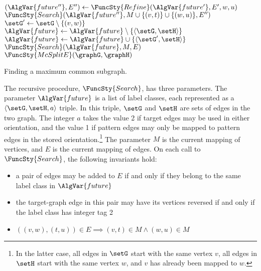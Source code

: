 \begin{algorithm}[htb]
{{{\nl        $(\AlgVar{future''}, E'') \gets \FuncSty{Refine}(\AlgVar{future'}, E', w, u)$ \;
\nl        $\FuncSty{Search}(\AlgVar{future''}, M\cup \{(v,t)\} \cup \{(w,u)\}, E'')$ \label{ExpandWithtu} \;
       } 
  }
\nl $\setG' \gets \setG \setminus \{(v,w)\}$ \label{RemoveVW} \;
\nl $\AlgVar{future} \gets \AlgVar{future} \setminus \{\langle \setG,\setH \rangle\}$\;
\nl {} {$\AlgVar{future} \gets \AlgVar{future} \cup \{\langle \setG',\setH \rangle \}$}
\nl $\FuncSty{Search}(\AlgVar{future},M,E)$ \label{ExpandWithoutVW} \;
}
\;
\nl $\FuncSty{McSplitE}(\graphG,\graphH)$ \label{McSplitFun} \;
\nl {}
\caption{Finding a maximum common subgraph.}
\label{McSplitAlg}
\end{algorithm}

The recursive procedure,
$\FuncSty{Search}$, has three parameters.  The parameter $\AlgVar{future}$ is a
list of label classes, each represented as a $\langle \setG, \setH, a\rangle$
triple.  In this triple, $\setG$ and $\setH$ are sets of edges in the two
graph.  The integer $a$ takes the value 2 if target edges may be used in either
orientation, and the value 1 if pattern edges may only be mapped to pattern
edges in the stored orientation.\footnote{In the latter case, all edges in
$\setG$ start with the same vertex $v$, all edges in $\setH$ start with the
same vertex $w$, and $v$ has already been mapped to $w$.}  The parameter $M$ is
the current mapping of vertices, and $E$ is the current mapping of edges.  On
each call to $\FuncSty{Search}$, the following invariants hold:

\begin{itemize}
    \item a pair of edges may be added to $E$ if and only if they belong to the same label class in $\AlgVar{future}$
    \item the target-graph edge in this pair may have its vertices reversed if and only if the label class has integer tag 2
    \item $((v,w),(t,u)) \in E \implies (v,t) \in M \wedge (w,u) \in M$ 
\end{itemize}

